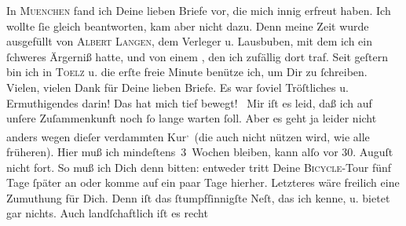 \begin{ledgroupsized}[t]{13cm}
           In \textsc{Muenchen} fand ich Deine lieben Briefe vor, die mich innig erfreut haben. Ich wollte ſie
               gleich beantworten, kam aber nicht dazu. Denn meine Zeit wurde ausgefüllt von \textsc{Albert Langen}, dem Verleger u. Lausbuben, mit dem ich ein
               ſchweres Ärgerniß hatte, und von einem \label{K_L02743-1v}\label{K_L02743-1h}, den ich
               zufällig dort traf. Seit geſtern bin ich in \textsc{Toelz} u. die erſte freie Minute benütze ich, um Dir zu ſchreiben.\pend
           \pstart
           Vielen, vielen Dank für Deine lieben Briefe. Es war ſoviel Tröſtliches u.
               Ermuthigendes darin! Das hat mich tief bewegt! {\dotsfive}\pend
           \pstart
           Mir iſt es leid, daß ich auf unſere Zuſammenkunft noch ſo lange warten {\pb}ſoll. Aber es geht ja leider nicht anders wegen
               dieſer verdammten Kur\substVorne{}\textsuperscript{,}\substDazwischen{} (\substHinten{}die auch nicht nützen wird, wie alle früheren). Hier muß ich
               mindeſtens 3 Wochen bleiben, kann alſo vor 30.{ }Auguſt nicht fort. So muß ich Dich denn bitten: entweder
               tritt Deine \textsc{Bicycle}-Tour fünf Tage ſpäter an {\pb}oder komme auf ein paar Tage hierher. Letzteres wäre
               freilich eine  Zumuthung für Dich. Denn \label{K_L02743-2v}\label{K_L02743-2h} iſt das ſtumpfſinnigſte Neſt, das ich kenne, u.  bietet gar nichts. Auch landſchaftlich iſt es recht

\end{ledgroupsized}
